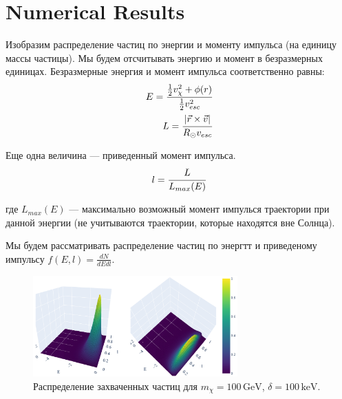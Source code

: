 \documentclass[a4paper, 14pt]{article}
\begin{document}
	
	
	
	\section{Numerical Results}
%    

Изобразим распределение частиц по энергии и моменту импульса (на единицу массы частицы). Мы будем отсчитывать энергию и момент в безразмерных единицах. Безразмерные энергия и момент импульса соответственно равны:
\begin{equation}
	\begin{split}
		E = \cfrac{\frac{1}{2} v_{\chi}^2 + \phi(r)}
		{\frac{1}{2} v_{esc}^2} \\
		L = \cfrac{|\vec{r} \times \vec{v}|}
		{R_{\odot} v_{esc}}
	\end{split}
	\label{eq:dimentionless}
\end{equation}

Еще одна величина --- приведенный момент импульса.
\begin{equation}
	l = \cfrac{L}{L_{max}(E)}
\end{equation}

где $L_{max}(E)$ --- максимально возможный момент импулься траектории при данной энергии (не учитываются траектории, которые находятся вне Солнца).

Мы будем рассматривать распределение частиц по энергтт и приведеному импульсу $f(E,l) = \frac{dN}{dE dl}$.

\begin{figure}[ht]
	\centering
	\includegraphics[width=0.7\textwidth]
	{images/Capt100_100.png}
	\caption{Распределение захваченных частиц для $m_{\chi} = 100\, \text{GeV}$, $\delta = 100\, \text{keV}$.}
	\label{fig:Capt100_100}
\end{figure}
\end{document}
